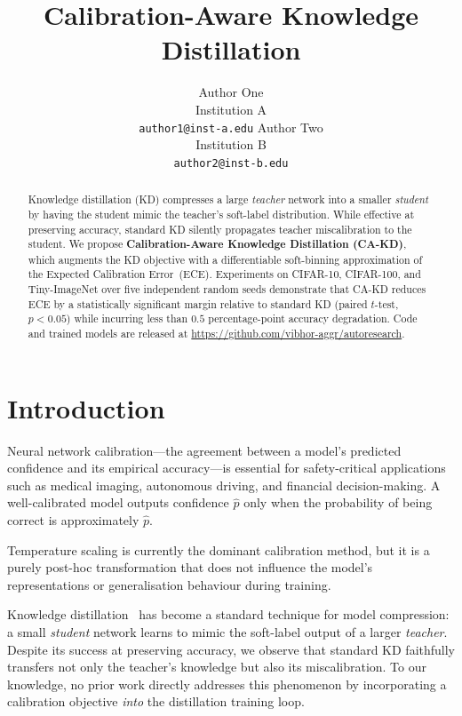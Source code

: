 \documentclass{article}
\title{Calibration-Aware Knowledge Distillation}
\author{%
  Author One \\
  Institution A \\
  \texttt{author1@inst-a.edu}
  \And
  Author Two \\
  Institution B \\
  \texttt{author2@inst-b.edu}
}
\begin{document}
\maketitle

\begin{abstract}
Knowledge distillation (KD) compresses a large \emph{teacher} network into a smaller
\emph{student} by having the student mimic the teacher's soft-label distribution.
While effective at preserving accuracy, standard KD silently propagates teacher
miscalibration to the student.
We propose \textbf{Calibration-Aware Knowledge Distillation (CA-KD)}, which augments
the KD objective with a differentiable soft-binning approximation of the Expected
Calibration Error~(ECE).
Experiments on CIFAR-10, CIFAR-100, and Tiny-ImageNet over five independent random seeds
demonstrate that CA-KD reduces ECE by a statistically significant margin relative to
standard KD (paired $t$-test, $p < 0.05$) while incurring less than $0.5$ percentage-point
accuracy degradation.
Code and trained models are released at \url{https://github.com/vibhor-aggr/autoresearch}.
\end{abstract}

\section{Introduction}
\label{sec:intro}

Neural network calibration—the agreement between a model's predicted confidence and its
empirical accuracy—is essential for safety-critical applications such as medical imaging,
autonomous driving, and financial decision-making.
A well-calibrated model outputs confidence $\hat{p}$ only when the probability of being
correct is approximately $\hat{p}$.

Temperature scaling \citep{guo2017calibration} is currently the dominant calibration method,
but it is a purely post-hoc transformation that does not influence the model's representations
or generalisation behaviour during training.

Knowledge distillation~\citep{hinton2015distilling} has become a standard technique for model
compression: a small \emph{student} network learns to mimic the soft-label output of a larger
\emph{teacher}.  Despite its success at preserving accuracy, we observe that standard KD
faithfully transfers not only the teacher's knowledge but also its miscalibration.
To our knowledge, no prior work directly addresses this phenomenon by incorporating a
calibration objective \emph{into} the distillation training loop.
\end{document}
